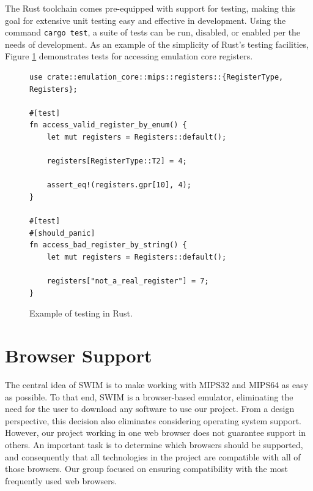 \documentclass[
    paper=letter,
    parskip=half,
    fontsize=12pt,
    titlepage=firstiscover,
    toc=bibliography,
    numbers=endperiod
]{scrartcl}
\let\oldsection\section
\renewcommand{\section}{\newpage\oldsection}
\begin{document}
The Rust toolchain comes pre-equipped with support for testing, making
this goal for extensive unit testing easy and effective in development.
Using the command \texttt{cargo test}, a suite of tests can be run,
disabled, or enabled per the needs of development. As an example of the
simplicity of Rust's testing facilities, Figure
\ref{fig:testing-registers-example} demonstrates tests for accessing
emulation core registers.

\begin{figure}[H]
    \begin{Verbatim}[frame=single, framesep=2mm, label=src/tests/emulation\_core/registers.rs]
use crate::emulation_core::mips::registers::{RegisterType, Registers};

#[test]
fn access_valid_register_by_enum() {
    let mut registers = Registers::default();

    registers[RegisterType::T2] = 4;

    assert_eq!(registers.gpr[10], 4);
}

#[test]
#[should_panic]
fn access_bad_register_by_string() {
    let mut registers = Registers::default();

    registers["not_a_real_register"] = 7;
}
    \end{Verbatim}
    \caption{Example of testing in Rust.}
    \label{fig:testing-registers-example}
\end{figure}




\section{Browser Support}
\label{sec:browser-support}

The central idea of SWIM is to make working with MIPS32 and MIPS64 as
easy as possible. To that end, SWIM is a browser-based emulator,
eliminating the need for the user to download any software to use our
project. From a design perspective, this decision also eliminates
considering operating system support. However, our project working in
one web browser does not guarantee support in others. An important task
is to determine which browsers should be supported, and consequently
that all technologies in the project are compatible with all of those
browsers. Our group focused on ensuring compatibility with the most
frequently used web browsers.
\end{document}
